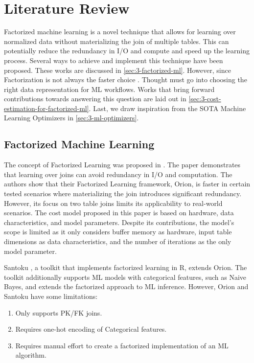 
\chapter{Literature Review}
\label{chapter:literature}

Factorized machine learning is a novel technique that allows for learning over normalized data without materializing the join of multiple tables. This can potentially reduce the redundancy in I/O and compute and speed up the learning process. Several ways to achieve and implement this technique have been proposed. These works are discussed in \autoref{sec:3-factorized-ml}. However, since Factorization is not always the faster choice \cite{orion_learning_gen_lin_models, morpheus, amalur,schijndel_cost_estimation}. Thought must go into choosing the right data representation for ML workflows. Works that bring forward contributions towards answering this question are laid out in \autoref{sec:3-cost-estimation-for-factorized-ml}. Last, we draw inspiration from the SOTA Machine Learning Optimizers in \autoref{sec:3-ml-optimizers}.

\section{Factorized Machine Learning}
\label{sec:3-factorized-ml}
The concept of Factorized Learning was proposed in \cite{orion_learning_gen_lin_models}. The paper demonstrates that learning over joins can avoid redundancy in I/O and computation. The authors show that their Factorized Learning framework, Orion, is faster in certain tested scenarios where materializing the join introduces significant redundancy. However, its focus on two table joins limits its applicability to real-world scenarios. The cost model proposed in this paper is based on hardware, data characteristics, and model parameters. Despite its contributions, the model's scope is limited as it only considers buffer memory as hardware, input table dimensions as data characteristics, and the number of iterations as the only model parameter.

Santoku \cite{santoku_kumar_demonstration_2015}, a toolkit that implements factorized learning in R, extends Orion. The toolkit additionally supports ML models with categorical features, such as Naive Bayes, and extends the factorized approach to ML inference. However, Orion and Santoku have some limitations:

\begin{enumerate}
    \item Only supports PK/FK joins.
    \item Requires one-hot encoding of Categorical features.
    \item Requires manual effort to create a factorized implementation of an ML algorithm.
\end{enumerate}

